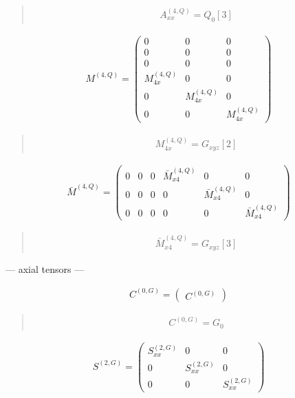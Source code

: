 \documentclass[fleqn,10pt]{jsarticle}
\begin{document}
\begin{quote}
\begin{align*}
& A^{(4,Q)}_{xx} = Q_{0}[3]
\end{align*}
\end{quote}
\begin{align*}
M^{(4,Q)} = \begin{pmatrix} 0 & 0 & 0 \\ 0 & 0 & 0 \\ 0 & 0 & 0 \\ M^{(4,Q)}_{4x} & 0 & 0 \\ 0 & M^{(4,Q)}_{4x} & 0 \\ 0 & 0 & M^{(4,Q)}_{4x} \end{pmatrix}
\end{align*}
\begin{quote}
\begin{align*}
& M^{(4,Q)}_{4x} = G_{xyz}[2]
\end{align*}
\end{quote}
\begin{align*}
\bar{M}^{(4,Q)} = \begin{pmatrix} 0 & 0 & 0 & \bar{M}^{(4,Q)}_{x4} & 0 & 0 \\ 0 & 0 & 0 & 0 & \bar{M}^{(4,Q)}_{x4} & 0 \\ 0 & 0 & 0 & 0 & 0 & \bar{M}^{(4,Q)}_{x4} \end{pmatrix}
\end{align*}
\begin{quote}
\begin{align*}
& \bar{M}^{(4,Q)}_{x4} = G_{xyz}[3]
\end{align*}
\end{quote}
\newpage
\begin{center}\LARGE --- axial tensors ---\end{center}
\begin{align*}
C^{(0,G)} = \begin{pmatrix} C^{(0,G)} \end{pmatrix}
\end{align*}
\begin{quote}
\begin{align*}
& C^{(0,G)} = G_{0}
\end{align*}
\end{quote}
\begin{align*}
S^{(2,G)} = \begin{pmatrix} S^{(2,G)}_{xx} & 0 & 0 \\ 0 & S^{(2,G)}_{xx} & 0 \\ 0 & 0 & S^{(2,G)}_{xx} \end{pmatrix}
\end{align*}
\end{document}
